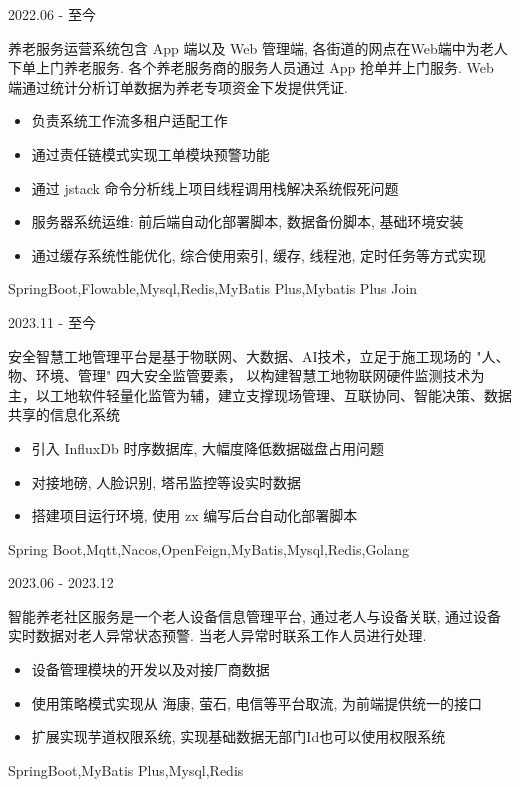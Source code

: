 \documentclass[zh]{resume}
\begin{document}
\begin{projects}
	\project
  {\color{accentcolor}{养老服务运营系统}}{2022.06 - 至今}
  {
    养老服务运营系统包含 App 端以及 Web 管理端, 各街道的网点在Web端中为老人下单上门养老服务.
    各个养老服务商的服务人员通过 App 抢单并上门服务. Web 端通过统计分析订单数据为养老专项资金下发提供凭证.
    \begin{itemize}
      \item 负责系统工作流多租户适配工作
      \item 通过责任链模式实现工单模块预警功能
      \item 通过 jstack 命令分析线上项目线程调用栈解决系统假死问题
      \item 服务器系统运维: 前后端自动化部署脚本, 数据备份脚本, 基础环境安装
      \item 通过缓存系统性能优化, 综合使用索引, 缓存, 线程池, 定时任务等方式实现
    \end{itemize}
  }
  {SpringBoot,Flowable,Mysql,Redis,MyBatis Plus,Mybatis Plus Join}

	\project
  {\color{accentcolor}{安全智慧工地管理平台}}{2023.11 - 至今}
  {
    安全智慧工地管理平台是基于物联网、大数据、AI技术，立足于施工现场的 "人、物、环境、管理" 四大安全监管要素，
    以构建智慧工地物联网硬件监测技术为主，以工地软件轻量化监管为辅，建立支撑现场管理、互联协同、智能决策、数据共享的信息化系统
    \begin{itemize}
      \item 引入 InfluxDb 时序数据库, 大幅度降低数据磁盘占用问题
      \item 对接地磅, 人脸识别, 塔吊监控等设实时数据
      \item 搭建项目运行环境, 使用 zx 编写后台自动化部署脚本
    \end{itemize}
  }
  {Spring Boot,Mqtt,Nacos,OpenFeign,MyBatis,Mysql,Redis,Golang}

	\project
  {\color{accentcolor}{智能养老社区服务}}{2023.06 - 2023.12}
  {
    智能养老社区服务是一个老人设备信息管理平台, 通过老人与设备关联, 通过设备实时数据对老人异常状态预警.
    当老人异常时联系工作人员进行处理.
    \begin{itemize}
      \item 设备管理模块的开发以及对接厂商数据
      \item 使用策略模式实现从 海康, 萤石, 电信等平台取流, 为前端提供统一的接口
      \item 扩展实现芋道权限系统, 实现基础数据无部门Id也可以使用权限系统
    \end{itemize}
  }
  {SpringBoot,MyBatis Plus,Mysql,Redis}


\end{projects}
\end{document}
